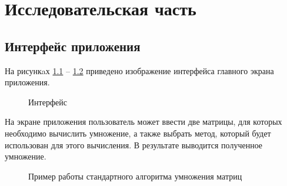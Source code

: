 \chapter{Исследовательская часть}

\section{Интерфейс приложения}

На рисункaх  \ref{fig:interface} -- \ref{fig:working1} приведено изображение интерфейса главного экрана приложения.
\FloatBarrier
\begin{figure}[h!]
	\caption{Интерфейс}
	\label{fig:interface}
\end{figure}
\FloatBarrier

На экране приложения пользователь может ввести две матрицы, для которых необходимо вычислить умножение, а также выбрать метод, который будет использован для этого вычисления. 
В результате выводится полученное умножение.
\FloatBarrier
\begin{figure}[h!]
	\caption{Пример работы стандартного алгоритма умножения матриц}
	\label{fig:working1}
\end{figure}
\FloatBarrier

